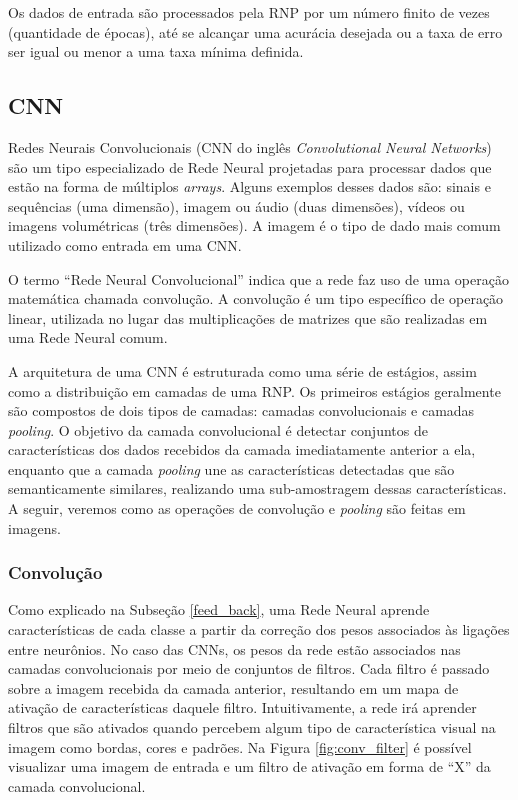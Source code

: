 \documentclass[
12pt,       %
openright,      %
oneside,      %
a4paper,      %
english,      %
french,       %
spanish,      %
brazil        %
]{abntex2}
\begin{document}
Os dados de entrada são processados pela RNP por um número finito de vezes (quantidade de épocas), até se alcançar uma acurácia desejada ou a taxa de erro ser igual ou menor a uma taxa mínima definida.

\subsection{CNN} \label{cnn}

Redes Neurais Convolucionais (CNN do inglês \textit{Convolutional Neural Networks}) \cite{lecun1989cnn} são um tipo especializado de Rede Neural projetadas para processar dados que estão na forma de múltiplos \textit{arrays}. Alguns exemplos desses dados são: sinais e sequências (uma dimensão), imagem ou áudio (duas dimensões), vídeos ou imagens volumétricas (três dimensões). A imagem é o tipo de dado mais comum utilizado como entrada em uma CNN. 

O termo ``Rede Neural Convolucional'' indica que a rede faz uso de uma operação matemática chamada convolução. A convolução é um tipo específico de operação linear, utilizada no lugar das multiplicações de matrizes que são realizadas em uma Rede Neural comum.

A arquitetura de uma CNN é estruturada como uma série de estágios, assim como a distribuição em camadas de uma RNP. Os primeiros estágios geralmente são compostos de dois tipos de camadas: camadas convolucionais e camadas \textit{pooling}. O objetivo da camada convolucional é detectar conjuntos de características dos dados recebidos da camada imediatamente anterior a ela, enquanto que a camada \textit{pooling} une as características detectadas que são semanticamente similares, realizando uma sub-amostragem dessas características. A seguir, veremos como as operações de convolução e \textit{pooling} são feitas em imagens.

\subsubsection{Convolução} \label{convolucao}

Como explicado na Subseção \ref{feed_back}, uma Rede Neural aprende características de cada classe a partir da correção dos pesos associados às ligações entre neurônios. No caso das CNNs, os pesos da rede estão associados nas camadas convolucionais por meio de conjuntos de filtros. Cada filtro é passado sobre a imagem recebida da camada anterior, resultando em um mapa de ativação de características daquele filtro. Intuitivamente, a rede irá aprender filtros que são ativados quando percebem algum tipo de característica visual na imagem como bordas, cores e padrões. Na Figura \ref{fig:conv_filter} é possível visualizar uma imagem de entrada e um filtro de ativação em forma de ``X'' da camada convolucional.
\end{document}
